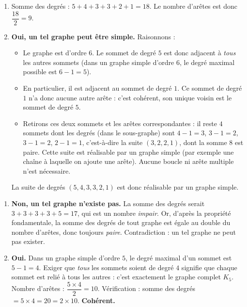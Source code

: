 \documentclass[11pt]{article}
\newcommand{\cle}[1]{{\popxbold\color{popdark}#1}}
\begin{document}
\begin{corrige}
\begin{enumerate}
\item Somme des degrés : $5 + 4 + 3 + 3 + 2 + 1 = 18$. Le nombre d'arêtes est donc $\dfrac{18}{2} = 9$.
\item \textbf{Oui, un tel graphe peut être simple.} Raisonnons :
\begin{itemize}
\item Le graphe est d'ordre $6$. Le sommet de degré $5$ est donc adjacent à \emph{tous} les autres sommets (dans un graphe simple d'ordre $6$, le degré maximal possible est $6 - 1 = 5$).
\item En particulier, il est adjacent au sommet de degré $1$. Ce sommet de degré $1$ n'a donc aucune autre arête : c'est cohérent, son unique voisin est le sommet de degré $5$.
\item Retirons ces deux sommets et les arêtes correspondantes : il reste $4$ sommets dont les degrés (dans le sous-graphe) sont $4 - 1 = 3$, $3 - 1 = 2$, $3 - 1 = 2$, $2 - 1 = 1$, c'est-à-dire la suite $(3, 2, 2, 1)$, dont la somme $8$ est paire. Cette suite est réalisable par un graphe simple (par exemple une chaîne à laquelle on ajoute une arête). Aucune boucle ni arête multiple n'est nécessaire.
\end{itemize}
La suite de degrés $(5, 4, 3, 3, 2, 1)$ est donc réalisable par un graphe simple.
\end{enumerate}
\end{corrige}

\begin{corrige}
\begin{enumerate}
\item \textbf{Non, un tel graphe n'existe pas.} La somme des degrés serait $3 + 3 + 3 + 3 + 5 = 17$, qui est un nombre \emph{impair}. Or, d'après la propriété fondamentale, la somme des degrés de tout graphe est égale au double du nombre d'arêtes, donc toujours \emph{paire}. Contradiction : un tel graphe ne peut pas exister.
\item \textbf{Oui.} Dans un graphe simple d'ordre $5$, le degré maximal d'un sommet est $5 - 1 = 4$. Exiger que \emph{tous} les sommets soient de degré $4$ signifie que chaque sommet est relié à tous les autres : c'est exactement le graphe \cle{complet} $K_5$. Nombre d'arêtes : $\dfrac{5 \times 4}{2} = 10$. Vérification : somme des degrés $= 5 \times 4 = 20 = 2 \times 10$. \textbf{Cohérent.}
\end{enumerate}
\end{corrige}
\end{document}
